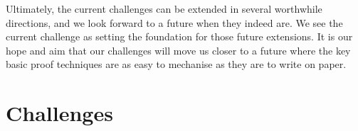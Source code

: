 \documentclass[runningheads]{llncs}
\begin{document}
Ultimately, the current challenges can be extended in several worthwhile directions, and we look forward to a future when they indeed are.
We see the current challenge as setting the foundation for those future extensions.
It is our hope and aim that our challenges will move us closer to a future where the key basic proof techniques are as easy to mechanise as they are to write on paper.




\clearpage
\appendix
\section{Challenges}\label{app:challenges}

\end{document}

